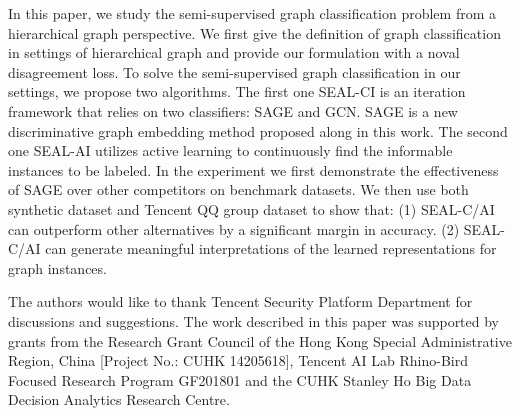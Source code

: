 \documentclass[sigconf]{acmart}
\begin{document}
{In this paper, we study the semi-supervised graph classification problem from a hierarchical graph perspective. We first give the definition of graph classification in settings of hierarchical graph and provide our formulation with a noval disagreement loss. To solve the semi-supervised graph classification in our settings, we propose two algorithms. The first one SEAL-CI is an iteration framework that relies on two classifiers: SAGE and GCN. SAGE is a new discriminative graph embedding method proposed along in this work. The second one SEAL-AI utilizes active learning to continuously find the informable instances to be labeled. In the experiment we first demonstrate the effectiveness of SAGE over other competitors on benchmark datasets. We then use both synthetic dataset and Tencent QQ group dataset to show that: (1) SEAL-C/AI can outperform other alternatives by a significant margin in accuracy. (2) SEAL-C/AI can generate meaningful interpretations of the learned representations for graph instances.
}
\begin{acks}
The authors would like to thank Tencent Security Platform Department for discussions and suggestions. The work described in this paper was supported by grants from the Research Grant Council of the Hong Kong Special Administrative Region, China [Project No.: CUHK 14205618], Tencent AI Lab Rhino-Bird Focused Research Program GF201801 and the CUHK Stanley Ho Big Data Decision Analytics Research Centre.

\end{acks}

 

\balance

\end{document}

